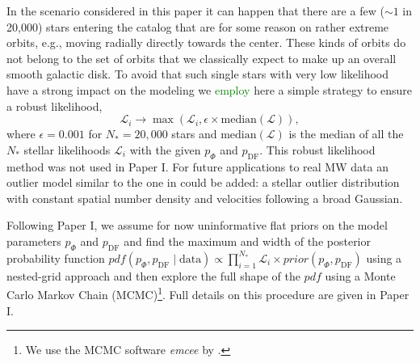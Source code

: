 \documentclass[iop,revtex4,numberedappendix,appendixfloats]{emulateapj}
\newcommand{\pdf}{\ensuremath{pdf}}
\newcommand{\NEW}[1]{\textcolor{Green}{#1}}
\newcommand{\OLD}[1]{}
\begin{document}
In the scenario considered in this paper it can happen that there are a few ($\sim 1$ in 20,000) stars entering the catalog that are for some reason  on rather extreme orbits, e.g., moving radially directly towards the center. These kinds of orbits do not belong to the set of orbits that we classically expect to make up an overall smooth galactic disk. To avoid that such single stars with very low likelihood have a strong impact on the modeling we \OLD{introduce}\NEW{employ} here a simple strategy to ensure a robust likelihood,
\begin{equation}
\mathscr{L}_i \longrightarrow \max \left( \mathscr{L}_i, \epsilon \times \text{median}(\mathscr{L})\right),
\end{equation}
where $\epsilon = 0.001$ for $N_*=20,000$ stars and $\text{median}(\mathscr{L})$ is the median of all the $N_*$ stellar likelihoods $\mathscr{L}_i$ with the given $p_\Phi$ and $p_\text{DF}$. This robust likelihood method was not used in Paper I. For future applications to real MW data an outlier model similar to the one in \OLD{\citet{2013ApJ...773...43B}}\NEW{\citet{2013ApJ...779..115B}} could be added: a stellar outlier distribution with constant spatial number density and velocities following a broad Gaussian.

Following Paper I, we assume for now uninformative flat priors on the model parameters $p_\Phi$ and $p_\text{DF}$ and find the maximum and width of the posterior probability function $pdf(p_\Phi,p_\text{DF} \mid \text{data}) \propto \prod_{i=1}^{N_*} \mathscr{L}_i \times prior(p_\Phi,p_\text{DF})$ using a nested-grid approach and then explore the full shape of the $\pdf$ using a Monte Carlo Markov Chain (MCMC)\footnote{We use the MCMC software \emph{emcee} by \citet{2013PASP..125..306F}.}. Full details on this procedure are given in Paper I.
\end{document}
